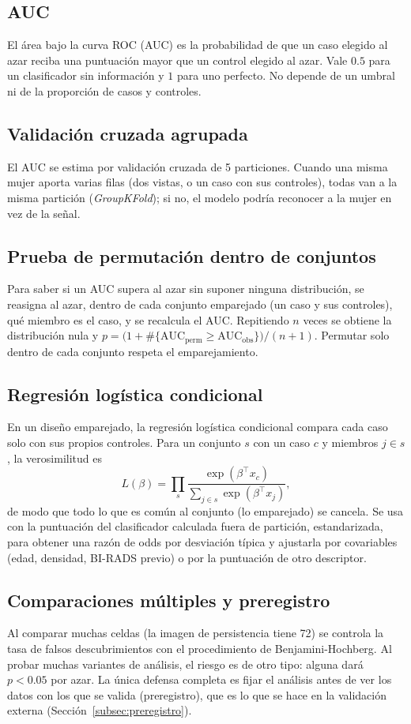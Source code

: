 \subsection{AUC}
El área bajo la curva ROC (AUC) es la probabilidad de que un caso elegido al
azar reciba una puntuación mayor que un control elegido al azar. Vale $0.5$
para un clasificador sin información y $1$ para uno perfecto. No depende de un
umbral ni de la proporción de casos y controles.

\subsection{Validación cruzada agrupada}
El AUC se estima por validación cruzada de 5 particiones. Cuando una misma
mujer aporta varias filas (dos vistas, o un caso con sus controles), todas
van a la misma partición (\textit{GroupKFold}); si no, el modelo podría
reconocer a la mujer en vez de la señal.

\subsection{Prueba de permutación dentro de conjuntos}
Para saber si un AUC supera al azar sin suponer ninguna distribución, se
reasigna al azar, dentro de cada conjunto emparejado (un caso y sus
controles), qué miembro es el caso, y se recalcula el AUC. Repitiendo $n$
veces se obtiene la distribución nula y
$p = \bigl(1 + \#\{\text{AUC}_\text{perm} \ge \text{AUC}_\text{obs}\}\bigr)/(n+1)$.
Permutar solo dentro de cada conjunto respeta el emparejamiento.

\subsection{Regresión logística condicional}
En un diseño emparejado, la regresión logística condicional compara cada
caso solo con sus propios controles. Para un conjunto $s$ con un caso $c$ y
miembros $j \in s$, la verosimilitud es
\[
  L(\beta) = \prod_{s} \frac{\exp(\beta^\top x_{c})}{\sum_{j \in s} \exp(\beta^\top x_{j})},
\]
de modo que todo lo que es común al conjunto (lo emparejado) se cancela. Se
usa con la puntuación del clasificador calculada fuera de partición,
estandarizada, para obtener una razón de odds por desviación típica y
ajustarla por covariables (edad, densidad, BI-RADS previo) o por la
puntuación de otro descriptor.

\subsection{Comparaciones múltiples y preregistro}
Al comparar muchas celdas (la imagen de persistencia tiene 72) se controla la
tasa de falsos descubrimientos con el procedimiento de Benjamini-Hochberg. Al
probar muchas variantes de análisis, el riesgo es de otro tipo: alguna dará
$p < 0.05$ por azar. La única defensa completa es fijar el análisis antes de
ver los datos con los que se valida (preregistro), que es lo que se hace en
la validación externa (Sección~\ref{subsec:preregistro}).
